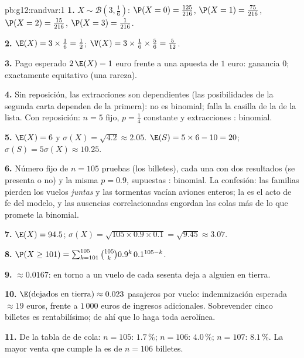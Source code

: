 \begin{solution}{pb:g12:randvar:1}
\textbf{1.} $X \sim \mathcal B\!\left(3, \frac16\right)$:
$\P(X = 0) = \frac{125}{216}$,
$\P(X = 1) = \frac{75}{216}$,
$\P(X = 2) = \frac{15}{216}$,
$\P(X = 3) = \frac{1}{216}$.

\textbf{2.} $\E(X) = 3 \times \frac16 = \frac12$;
$\V(X) = 3 \times \frac16 \times \frac56 = \frac{5}{12}$.

\textbf{3.} Pago esperado $2\,\E(X) = 1$ euro frente a una apuesta de $1$
euro: ganancia $0$; exactamente equitativo (una rareza).

\textbf{4.} Sin reposición, las extracciones son dependientes (las
posibilidades de la segunda carta dependen de la primera): no es binomial;
falla la casilla de la  de la lista. Con reposición: $n = 5$
fijo, $p = \frac14$ constante y extracciones : binomial.

\textbf{5.} $\E(X) = 6$ y $\sigma(X) = \sqrt{4.2} \approx 2.05$.
$\E(S) = 5 \times 6 - 10 = 20$; $\sigma(S) = 5\sigma(X) \approx 10.25$.

\textbf{6.} Número fijo de $n = 105$ pruebas (los billetes), cada una con
dos resultados (se presenta o no) y la misma $p = 0.9$, supuestas
: binomial. La confesión: las familias pierden los vuelos
\emph{juntas} y las tormentas vacían aviones enteros; la  es
el acto de fe del modelo, y las ausencias correlacionadas engordan las
colas más de lo que promete la binomial.

\textbf{7.} $\E(X) = 94.5$;
$\sigma(X) = \sqrt{105 \times 0.9 \times 0.1} = \sqrt{9.45} \approx 3.07$.

\textbf{8.} $\P(X \geq 101) = \sum_{k=101}^{105}
\binom{105}{k} 0.9^k\, 0.1^{105 - k}$.

\textbf{9.} $\approx 0.0167$: en torno a un vuelo de cada sesenta deja a
alguien en tierra.

\textbf{10.} $\E(\text{dejados en tierra}) \approx 0.023$ pasajeros por
vuelo: indemnización esperada $\approx 19$ euros, frente a $1\,000$ euros
de ingresos adicionales. Sobrevender cinco billetes es rentabilísimo; de
ahí que lo haga toda aerolínea.

\textbf{11.} De la tabla de  de cola: $n = 105$:
$1.7\,\%$; $n = 106$: $4.0\,\%$; $n = 107$: $8.1\,\%$. La mayor venta que
cumple la  es de $n = 106$ billetes.


\end{solution}
